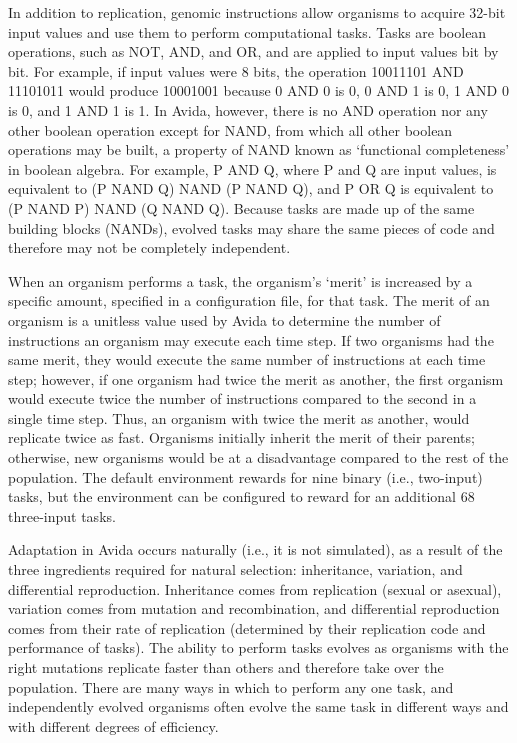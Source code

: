 \begin{doublespace}
In addition to replication, genomic instructions allow organisms
to acquire 32-bit input values and use them to perform computational tasks.
%
Tasks are boolean operations, such as NOT, AND, and OR,
and are applied to input values bit by bit.
%
For example, if input values were 8 bits,
the operation 10011101 AND 11101011 would produce 10001001
because 0 AND 0 is 0, 0 AND 1 is 0, 1 AND 0 is 0, and 1 AND 1 is 1.
%
In Avida, however, there is no AND operation nor any other boolean operation
except for NAND, from which all other boolean operations may be built,
a property of NAND known as `functional completeness' in boolean algebra.
%
For example, P AND Q, where P and Q are input values,
is equivalent to (P NAND Q) NAND (P NAND Q),
and P OR Q is equivalent to (P NAND P) NAND (Q NAND Q).
%
Because tasks are made up of the same building blocks (NANDs),
evolved tasks may share the same pieces of code
and therefore may not be completely independent.



When an organism performs a task, the organism's `merit' is increased
by a specific amount, specified in a configuration file, for that task.
%
The merit of an organism is a unitless value used by Avida
to determine the number of instructions an organism may execute each time step.
%
If two organisms had the same merit,
they would execute the same number of instructions at each time step;
however, if one organism had twice the merit as another,
the first organism would execute twice the number of instructions
compared to the second in a single time step.
%
Thus, an organism with twice the merit as another,
would replicate twice as fast.
%
Organisms initially inherit the merit of their parents;
otherwise, new organisms would be at a disadvantage
compared to the rest of the population.
%
The default environment rewards for nine binary (i.e., two-input) tasks,
but the environment can be configured to reward for an additional 68
three-input tasks.



Adaptation in Avida occurs naturally (i.e., it is not simulated),
as a result of the three ingredients required for natural selection:
inheritance, variation, and differential reproduction.
%
Inheritance comes from replication (sexual or asexual),
variation comes from mutation and recombination,
and differential reproduction comes from their rate of replication
(determined by their replication code and performance of tasks).
%
The ability to perform tasks evolves as organisms with the right mutations
replicate faster than others and therefore take over the population.
%
There are many ways in which to perform any one task,
and independently evolved organisms often evolve the same task
in different ways and with different degrees of efficiency.




\end{doublespace}
